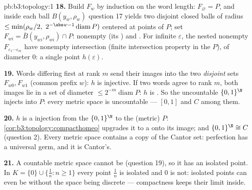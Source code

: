 \begin{solution}{pb:b3:topology:1}
\textbf{18.} Build $F_w$ by induction on the word length:
$F_\varnothing = P$, and inside each ball $B(y_w, \rho_w)$
question 17 yields two disjoint closed balls of radius $\leq
\min(\rho_w/2,\ 2^{-\abs w-1}\operatorname{diam}P)$ centered
at points of $P$; set $F_{wi} = \bar B(y_{wi}, \rho_{wi})
\cap P$: nonempty (its ) and . For infinite
$\varepsilon$, the nested nonempty 
$F_{\varepsilon_1\cdots\varepsilon_m}$ have nonempty
intersection (finite intersection property in the 
$P$), of diameter $0$: a single point $h(\varepsilon)$.

\textbf{19.} Words differing first at rank $m$ send their
images into the two \emph{disjoint} sets $F_{w0}, F_{w1}$
(common prefix $w$): $h$ is injective. If two words agree to
rank $m$, both images lie in a set of diameter $\leq
2^{-m}\operatorname{diam}P$: $h$ is . So the
uncountable $\{0,1\}^\N$ injects into $P$: every 
 metric space is uncountable --- $[0,1]$ and $C$
among them.

\textbf{20.} $h$ is a  injection from the 
$\{0,1\}^\N$ to the  (metric) $P$:
\cref{cor:b3:topology:compacthomeo} upgrades it to a
 onto its image; and $\{0,1\}^\N \cong C$
(question 2). Every   metric space contains a
copy of the Cantor set: perfection has a universal germ, and
it is Cantor's.

\textbf{21.} A countable  metric space cannot be
 (question 19), so it has an isolated point. In $K =
\{0\}\cup\{\frac1n : n \geq 1\}$ every point $\frac1n$ is
isolated and $0$ is not: isolated points can even be 
without the space being discrete --- compactness keeps their
limit inside.


\end{solution}
